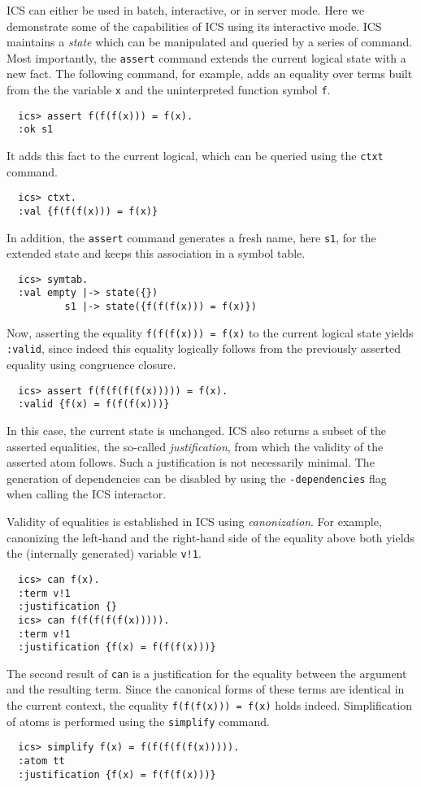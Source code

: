 \documentclass[12pt]{article}
\begin{document}
ICS can either be used in batch, interactive, or in server mode. 
Here we demonstrate some of the capabilities of ICS using its 
interactive mode. ICS maintains a {\em state} which can be
manipulated and queried by a series of command.  Most 
importantly, the {\tt assert} command extends the 
current logical state with a new fact.  The following 
command, for example, adds an equality over terms built
from the the variable {\tt x} and the uninterpreted 
function symbol {\tt f}\@.
  \begin{verbatim}
  ics> assert f(f(f(x))) = f(x).
  :ok s1
  \end{verbatim}
It adds this fact to the current logical, which
can be queried using the {\tt ctxt} command.
  \begin{verbatim}
  ics> ctxt.
  :val {f(f(f(x))) = f(x)}
  \end{verbatim}
In addition, the {\tt assert} command generates a
fresh name, here {\tt s1}, for the extended state
and keeps this association in a symbol table.
  \begin{verbatim}
  ics> symtab.
  :val empty |-> state({})
          s1 |-> state({f(f(f(x))) = f(x)})
  \end{verbatim}
Now, asserting the equality {\tt f(f(f(x))) = f(x)} to
the current logical state yields {\tt :valid}, since
indeed this equality logically follows from the 
previously asserted equality using congruence closure.
  \begin{verbatim}
  ics> assert f(f(f(f(f(x))))) = f(x).
  :valid {f(x) = f(f(f(x)))}
  \end{verbatim}
In this case, the current state is unchanged. ICS also 
returns a subset of the asserted equalities, the so-called 
{\em justification}, from which the validity of the 
asserted atom follows. Such a justification is not necessarily
minimal.  The generation of dependencies can be disabled by using
the {\tt -dependencies} flag when calling the ICS interactor.


Validity of equalities is established in ICS using {\em canonization}\@.
For example, canonizing the left-hand and the right-hand side
of the equality above both yields  the (internally generated)
variable {\tt v!1}\@.
  \begin{verbatim}
  ics> can f(x).
  :term v!1
  :justification {}
  ics> can f(f(f(f(f(x))))).
  :term v!1
  :justification {f(x) = f(f(f(x)))}
  \end{verbatim}
The second result of {\tt can} is a justification for the equality
between the argument and the resulting term.  Since the canonical forms of these 
terms are identical in the current context, the equality {\tt f(f(f(x))) = f(x)} 
holds indeed.  Simplification of atoms is performed using the {\tt simplify}
command.
  \begin{verbatim}
  ics> simplify f(x) = f(f(f(f(f(x))))). 
  :atom tt
  :justification {f(x) = f(f(f(x)))}
  \end{verbatim}
\end{document}
